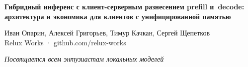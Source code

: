 \documentclass[10pt,a4paper]{article}
\begin{document}
\begin{center}
{\large\bfseries Гибридный инференс с клиент-серверным разнесением prefill и~decode:\\
архитектура и экономика для клиентов с унифицированной памятью\par}
\vspace{6pt}
Иван Опарин, Алексей Григорьев, Тимур Качкан, Сергей Щепетков\\
Relux Works · github.com/relux-works\\
\paperversionline\par
\vspace{4pt}
{\small\itshape Посвящается всем энтузиастам локальных моделей\par}
\end{center}























\end{document}
